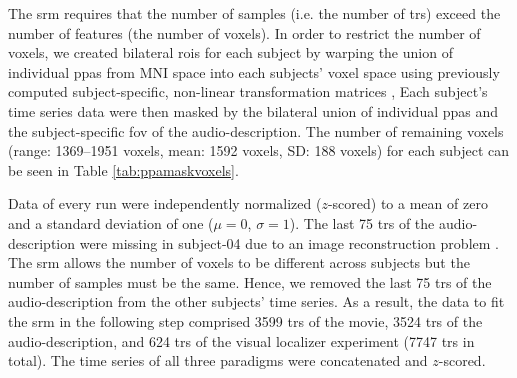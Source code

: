 

The \ac{srm} requires that the number of samples (i.e. the number of \acp{tr})
exceed the number of features (the number of voxels).
%
In order to restrict the number of voxels, we created bilateral \acp{roi} for
each subject by warping the union of individual \acp{ppa}
\citep[s.][]{haeusler2022processing} from MNI space into each subjects' voxel
space using previously computed subject-specific, non-linear transformation
matrices
\citep[][\href{https://github.com/psychoinformatics-de/studyforrest-data-templatetransforms
}{\url{github.com/psychoinformatics-de/studyforrest-data-templatetransforms}}]{hanke2014audiomovie},
Each subject's time series data were then masked by the bilateral union of
individual \acp{ppa} and the subject-specific \ac{fov} of the audio-description.
The number of remaining voxels (range: 1369--1951 voxels, mean: 1592 voxels, SD:
188 voxels) for each subject can be seen in Table \ref{tab:ppamaskvoxels}.


Data of every run were independently normalized ($z$-scored) to a mean of zero
and a standard deviation of one ($\mu=0$, $\sigma=1$).
%
The last 75 \acp{tr} of the audio-description were missing in subject-04 due to
an image reconstruction problem \citep[s.][]{hanke2014audiomovie}.
%
The \ac{srm} allows the number of voxels to be different across subjects but the
number of samples must be the same.
%
Hence, we removed the last 75 \acp{tr} of the audio-description from the other
subjects' time series.
As a result, the data to fit the \ac{srm} in the following step comprised 3599
\acp{tr} of the movie, 3524 \acp{tr} of the audio-description, and 624 \acp{tr}
of the visual localizer experiment (7747 \acp{tr} in total).
The time series of all three paradigms were concatenated and $z$-scored.


